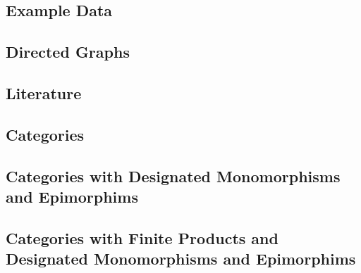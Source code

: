 \subsection{Example Data}


\subsection{Directed Graphs}



\subsection{Literature}


\subsection{Categories}


\subsection{Categories with Designated Monomorphisms and Epimorphims}


\subsection{Categories with Finite Products and Designated Monomorphisms and Epimorphims}


\iffalse
\subsection{Entity-Relationship Notation}


\subsection{Unused}

\fi

\iffalse
\begin{frame}{Bibliography}

\end{frame}
\fi

